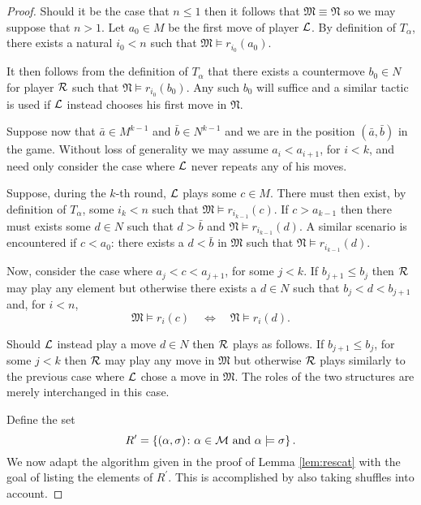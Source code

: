 \begin{proof}
	Should it be the case that $n\leq 1$ then it follows that $\mathfrak{M}\equiv\mathfrak{N}$ so we may suppose that $n>1$.  Let $a_0\in M$ be the first move of player $\mathcal{L}$.  By definition of $T_\alpha$, there exists a natural $i_0<n$ such that $\mathfrak{M}\models r_{i_0}(a_0)$.

	It then follows from the definition of $T_\alpha$ that there exists a countermove $b_0\in N$ for player $\mathcal{R}$ such that $\mathfrak{N}\models r_{i_0}(b_0)$.  Any such $b_0$ will suffice and a similar tactic is used if $\mathcal{L}$ instead chooses his first move in $\mathfrak{N}$.

	Suppose now that $\bar{a}\in M^{k-1}$ and $\bar{b}\in N^{k-1}$ and we are in the position $(\bar{a},\bar{b})$ in the game.  Without loss of generality we may assume $a_i<a_{i+1}$, for $i<k$, and need only consider the case where $\mathcal{L}$ never repeats any of his moves.

	Suppose, during the $k$-th round, $\mathcal{L}$ plays some $c\in M$.  There must then exist, by definition of $T_\alpha$, some $i_k<n$ such that $\mathfrak{M}\models r_{i_{k-1}}(c)$.  If $c>a_{k-1}$ then there must exists some $d\in N$ such that $d>\bar{b}$ and $\mathfrak{N}\models r_{i_{k-1}}(d)$.  A similar scenario is encountered if $c<a_0$: there exists a $d<\bar{b}$ in $\mathfrak{M}$ such that $\mathfrak{N}\models r_{i_{k-1}}(d)$.

	Now, consider the case where $a_j<c<a_{j+1}$, for some $j<k$.  If $b_{j+1}\leq b_j$ then $\mathcal{R}$ may play any element but otherwise there exists a $d\in N$ such that $b_j<d<b_{j+1}$ and, for $i<n$,
	\begin{equation}
		\mathfrak{M}\models r_i(c)\quad\iff\quad\mathfrak{N}\models r_i(d).
	\end{equation}

	Should $\mathcal{L}$ instead play a move $d\in N$ then $\mathcal{R}$ plays as follows.  If $b_{j+1}\leq b_j$, for some $j<k$ then $\mathcal{R}$ may play any move in $\mathfrak{M}$ but otherwise $\mathcal{R}$ plays similarly to the previous case where $\mathcal{L}$ chose a move in $\mathfrak{M}$.  The roles of the two structures are merely interchanged in this case.

	Define the set
	\begin{equation}
		R^\prime=\left\lbrace (\alpha,\sigma)\colon \alpha\in\mathcal{M}\text{ and }\alpha\models\sigma \right\rbrace.
	\end{equation}
	We now adapt the algorithm given in the proof of Lemma \ref{lem:rescat} with the goal of listing the elements of $R^\prime$.  This is accomplished by also taking shuffles into account.


\end{proof}
